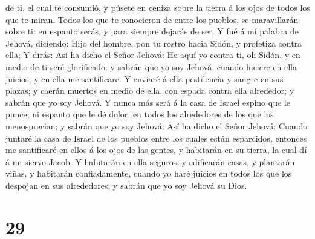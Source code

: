de ti, el cual te consumió, y púsete en ceniza sobre la tierra á los
ojos de todos los que te miran.  Todos los que te
conocieron de entre los pueblos, se maravillarán sobre ti: en espanto
serás, y para siempre dejarás de ser.  Y fué á mí palabra
de Jehová, diciendo:  Hijo del hombre, pon tu rostro hacia
Sidón, y profetiza contra ella;  Y dirás: Así ha dicho el
Señor Jehová: He aquí yo contra ti, oh Sidón, y en medio de ti seré
glorificado: y sabrán que yo soy Jehová, cuando hiciere en ella juicios,
y en ella me santificare.  Y enviaré á ella pestilencia y
sangre en sus plazas; y caerán muertos en medio de ella, con espada
contra ella alrededor; y sabrán que yo soy Jehová.  Y nunca
más será á la casa de Israel espino que le punce, ni espanto que le dé
dolor, en todos los alrededores de los que los menosprecian; y sabrán
que yo soy Jehová.  Así ha dicho el Señor Jehová: Cuando
juntaré la casa de Israel de los pueblos entre los cuales están
esparcidos, entonces me santificaré en ellos á los ojos de las gentes, y
habitarán en su tierra, la cual dí á mi siervo Jacob.  Y
habitarán en ella seguros, y edificarán casas, y plantarán viñas, y
habitarán confiadamente, cuando yo haré juicios en todos los que los
despojan en sus alrededores; y sabrán que yo soy Jehová su Dios.

\hypertarget{section-28}{%
\section{29}\label{section-28}}

